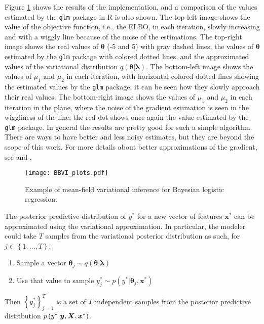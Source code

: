 Figure \ref{fig:BBVI_plots} shows the results of the implementation, and a comparison of the values estimated by the \texttt{glm} package in R is also shown. The top-left image shows the value of the objective function, i.e., the ELBO, in each iteration, slowly increasing and with a wiggly line because of the noise of the estimations. The top-right image shows the real values of $\boldsymbol{\theta}$ (-5 and 5) with gray dashed lines, the values of $\boldsymbol{\theta}$ estimated by the \texttt{glm} package with colored dotted lines, and the approximated values of the variational distribution $q(\boldsymbol{\theta} | \boldsymbol{\lambda})$. The bottom-left image shows the values of $\mu_1$ and $\mu_2$ in each iteration, with horizontal colored dotted lines showing the estimated values by the \texttt{glm} package; it can be seen how they slowly approach their real values. The bottom-right image shows the values of $\mu_1$ and $\mu_2$ in each iteration in the plane, where the noise of the gradient estimation is seen in the wiggliness of the line; the red dot shows once again the value estimated by the \texttt{glm} package. In general the results are pretty good for such a simple algorithm. There are ways to have better and less noisy estimates, but they are beyond the scope of this work. For more details about better approximations of the gradient, see \cite{kucukelbir2017automatic} and \cite{ranganath2014black}.

\begin{figure}[H]
    \centering
    \texttt{[image: BBVI\_plots.pdf]}
    \caption{Example of mean-field variational inference for Bayesian logistic regression.}
    \label{fig:BBVI_plots}
\end{figure}

The posterior predictive distribution of $y^*$ for a new vector of features $\boldsymbol{x}^*$ can be approximated using the variational approximation. In particular, the modeler could take $T$ samples from the variational posterior distribution as such, for $j \in \left\{ 1, \ldots, T \right\}$:
\begin{enumerate}
  \item Sample a vector $\boldsymbol{\theta}_j \sim q(\boldsymbol{\theta} | \boldsymbol{\lambda})$
  \item Use that value to sample $y_j^* \sim p(y^* | \boldsymbol{\theta}_j, \boldsymbol{x}^*)$
\end{enumerate}

Then $\left\{ y_j^* \right\}_{j = 1}^T$ is a set of $T$ independent samples from the posterior predictive distribution $p\left( y^* | \boldsymbol{y}, \boldsymbol{X}, \boldsymbol{x}^* \right)$.

